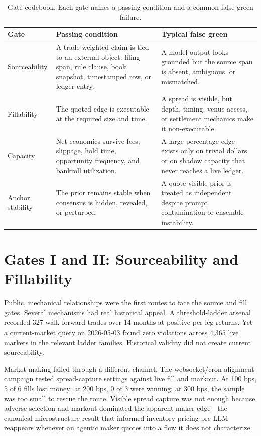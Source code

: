 \documentclass[11pt]{article}
\begin{document}
\begin{table}[t]
\centering
\caption{Gate codebook. Each gate names a passing condition and a common false-green failure.}
\label{tab:gate-codebook}
\small
\begin{tabular}{p{1.8cm}p{4.0cm}p{4.4cm}}
\toprule
Gate & Passing condition & Typical false green \\
\midrule
Sourceability & A trade-weighted claim is tied to an external object: filing span, rule clause, book snapshot, timestamped row, or ledger entry. & A model output looks grounded but the source span is absent, ambiguous, or mismatched. \\
Fillability & The quoted edge is executable at the required size and time. & A spread is visible, but depth, timing, venue access, or settlement mechanics make it non-executable. \\
Capacity & Net economics survive fees, slippage, hold time, opportunity frequency, and bankroll utilization. & A large percentage edge exists only on trivial dollars or on shadow capacity that never reaches a live ledger. \\
Anchor stability & The prior remains stable when consensus is hidden, revealed, or perturbed. & A quote-visible prior is treated as independent despite prompt contamination or ensemble instability. \\
\bottomrule
\end{tabular}
\end{table}

\section{Gates I and II: Sourceability and Fillability}

Public, mechanical relationships were the first routes to face the source and fill gates. Several mechanisms had real historical appeal. A threshold-ladder arsenal recorded 327 walk-forward trades over 14 months at positive per-leg returns. Yet a current-market query on 2026-05-03 found zero violations across 4,365 live markets in the relevant ladder families. Historical validity did not create current sourceability.

Market-making failed through a different channel. The websocket/cron-alignment campaign tested spread-capture settings against live fill and markout. At 100 bps, 5 of 6 fills lost money; at 200 bps, 0 of 3 were winning; at 300 bps, the sample was too small to rescue the route. Visible spread capture was not enough because adverse selection and markout dominated the apparent maker edge---the canonical microstructure result that informed inventory pricing pre-LLM \citep{GlostenMilgrom1985} reappears whenever an agentic maker quotes into a flow it does not characterize.
\end{document}
